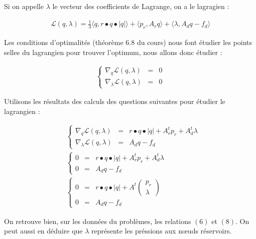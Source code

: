 \documentclass[11pt]{article}
\begin{document}
Si on appelle $\lambda$ le vecteur des coefficients de Lagrange, on a le lagragien :

\begin{align*}
  \boxed{ \mathcal{L}(q, \lambda) = \frac{1}{3} \langle q, r \bullet q \bullet |q| \rangle + \langle p_r, A_r q \rangle + \langle \lambda , A_d q - f_d \rangle }
\end{align*}

Les conditions d'optimalités (théorème $6.8$ du cours) nous font étudier les points selles du lagrangien pour trouver l'optimum, nous allons donc étudier :

\begin{align*}
  \left\{
  \begin{array}{lcl}
    \nabla_q \mathcal{L}(q , \lambda) & = & 0 \\
    \nabla_{\lambda} \mathcal{L}(q, \lambda) & = & 0
  \end{array}
  \right.
\end{align*}

Utilisons les résultats des calculs des questions suivantes pour étudier le lagrangien :

\begin{align*}
  &\left\{
  \begin{array}{lcl}
    \nabla_q \mathcal{L}(q , \lambda) & = & r \bullet q \bullet |q| + A_r^t p_r + A_d^t \lambda \\
    \nabla_{\lambda} \mathcal{L}(q, \lambda) & = & A_d q - f_d
  \end{array}
  \right.
  \\
  &\left\{
  \begin{array}{lcl}
    0 & = & r \bullet q \bullet |q| + A_r^t p_r + A_d^t \lambda \\
    0 & = & A_d q - f_d
  \end{array}
  \right.
  \\
  &\left\{
  \begin{array}{lcl}
    0 & = & r \bullet q \bullet |q| + A^t \begin{pmatrix} p_r \\ \lambda \end{pmatrix} \\
    0 & = & A_d q - f_d
  \end{array}
  \right.
\end{align*}

On retrouve bien, sur les données du problèmes, les relations $(6)$ et $(8)$. On peut aussi en déduire que $\lambda$ représente les préssions aux n\oe{}uds réservoirs.
\end{document}
